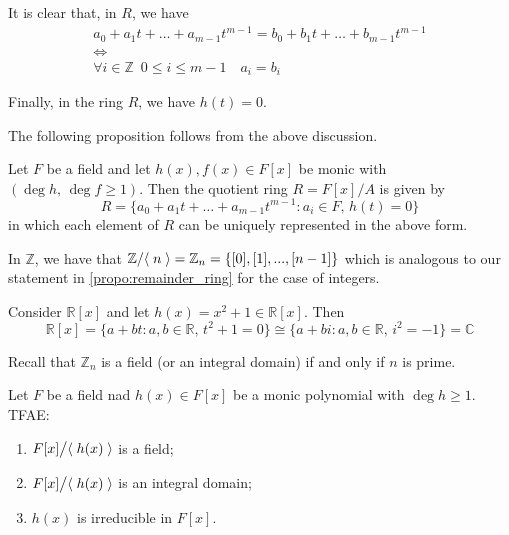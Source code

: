 It is clear that, in $R$, we have
\begin{gather*}
  a_0 + a_1 t + \hdots + a_{m - 1} t^{m - 1} = b_0 + b_1 t + \hdots + b_{m - 1} t^{m - 1} \\
  \iff \\
  \forall i \in \mathbb{Z} \enspace 0 \leq i \leq m - 1 \quad a_i = b_i
\end{gather*}

Finally, in the ring $R$, we have $h(t) = 0$.

The following proposition follows from the above discussion.

\begin{propo}
\label{propo:remainder_ring}
Let $F$ be a field and let $h(x), f(x) \in F[x]$ be monic with $( \deg h, \, \deg f \geq 1 )$. Then the quotient ring $R = F[x] / A$ is given by
\begin{equation*}
  R = \{ a_0 + a_1 t + \hdots + a_{m - 1} t^{m - 1} : a_i \in F, \, h(t) = 0 \}
\end{equation*}
in which each element of $R$ can be uniquely represented in the above form.
\end{propo}

\begin{note}
  In $\mathbb{Z}$, we have that $\mathbb{Z} / \langle \; n \; \rangle = \mathbb{Z}_n = \{ [0], [1], ..., [n-1] \}$ which is analogous to our statement in \cref{propo:remainder_ring} for the case of integers.
\end{note}

\begin{eg}
  Consider $\mathbb{R}[x]$ and let $h(x) = x^2 + 1 \in \mathbb{R}[x]$. Then
  \begin{equation*}
    \mathbb{R}[x] = \{a + bt : a, b \in \mathbb{R}, \, t^2 + 1 = 0 \} \cong \{ a + bi : a, b \in \mathbb{R}, \, i^2 = -1 \} = \mathbb{C}
  \end{equation*}
\end{eg}

\begin{note}
  Recall that $\mathbb{Z}_n$ is a field (or an integral domain) if and only if $n$ is prime.
\end{note}

\begin{propo}
\label{propo:principal_ideals_of_polyms_as_fields}
  Let $F$ be a field nad $h(x) \in F[x]$ be a monic polynomial with $\deg h \geq 1$. TFAE:
  \begin{enumerate}
    \item $F[x] \big/ \langle \; h(x) \; \rangle$ is a field;
    \item $F[x] \big/ \langle \; h(x) \; \rangle$ is an integral domain;
    \item $h(x)$ is irreducible in $F[x]$.
  \end{enumerate}
\end{propo}

